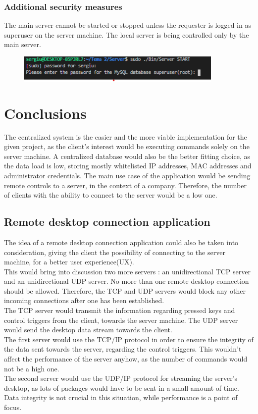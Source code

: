 \documentclass[runningheads]{llncs}
\begin{document}
\subsubsection{Additional security measures}
The main server cannot be started or stopped unless the requester is logged in as superuser on the server machine. The local server is being controlled only by the main server.\\
\begin{figure}[H]
\centering
\includegraphics[width=100mm]{Superuser.png}
\end{figure}

\section{Conclusions}
The centralized system is the easier and the more viable implementation for the given project, as the client's interest would be executing commands solely on the server machine. A centralized database would also be the better fitting choice, as the data load is low, storing mostly whitelisted IP addresses, MAC addresses and administrator credentials. The main use case of the application would be sending remote controls to a server, in the context of a company. Therefore, the number of clients with the ability to connect to the server would be a low one.

\subsection{Remote desktop connection application}
The idea of a remote desktop connection application could also be taken into consideration, giving the client the possibility of connecting to the server machine, for a better user experience(UX).\\
This would bring into discussion two more servers : an unidirectional TCP server and an unidirectional UDP server. No more than one remote desktop connection should be allowed. Therefore, the TCP and UDP servers would block any other incoming connections after one has been established.\\
The TCP server would transmit the information regarding pressed keys and control triggers from the client, towards the server machine. The UDP server would send the desktop data stream towards the client.\\
The first server would use the TCP/IP protocol in order to ensure the integrity of the data sent towards the server, regarding the control triggers. This wouldn't affect the performance of the server anyhow, as the number of commands would not be a high one.\\
The second server would use the UDP/IP protocol for streaming the server's desktop, as lots of packages would have to be sent in a small amount of time. Data integrity is not crucial in this situation, while performance is a point of focus.\\
\end{document}

